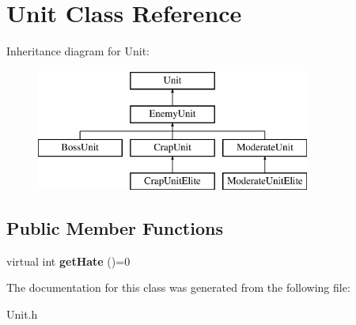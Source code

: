 \hypertarget{class_unit}{}\section{Unit Class Reference}
\label{class_unit}
Inheritance diagram for Unit\+:\begin{figure}[H]
\begin{center}
\leavevmode
\includegraphics[height=4.000000cm]{class_unit}
\end{center}
\end{figure}
\subsection*{Public Member Functions}
\begin{DoxyCompactItemize}
\item 
\hypertarget{class_unit_ade8d5e579e440d8a24fcc06bdf876d0e}{}virtual int {\bfseries get\+Hate} ()=0\label{class_unit_ade8d5e579e440d8a24fcc06bdf876d0e}

\end{DoxyCompactItemize}


The documentation for this class was generated from the following file\+:\begin{DoxyCompactItemize}
\item 
Unit.\+h\end{DoxyCompactItemize}

